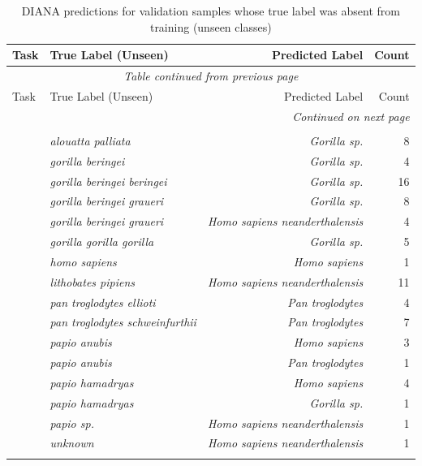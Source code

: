 \begin{longtable}{llrr}
\caption{DIANA predictions for validation samples whose true label was absent from training (unseen classes)\label{tab:unseen_labels}}\\
\toprule
Task & True Label (Unseen) & Predicted Label & Count \\
\midrule
\endfirsthead
\multicolumn{4}{c}{\textit{Table \thetable{} continued from previous page}} \\
\toprule
Task & True Label (Unseen) & Predicted Label & Count \\
\midrule
\endhead
\midrule
\multicolumn{4}{r}{\textit{Continued on next page}} \\
\endfoot
\bottomrule
\endlastfoot
\multicolumn{4}{l}{\textbf{Sample Host}} \\
\addlinespace[0.5em]
 & \textit{alouatta palliata} & \textit{Gorilla sp.} & 8 \\
 & \textit{gorilla beringei} & \textit{Gorilla sp.} & 4 \\
 & \textit{gorilla beringei beringei} & \textit{Gorilla sp.} & 16 \\
 & \textit{gorilla beringei graueri} & \textit{Gorilla sp.} & 8 \\
 & \textit{gorilla beringei graueri} & \textit{Homo sapiens neanderthalensis} & 4 \\
 & \textit{gorilla gorilla gorilla} & \textit{Gorilla sp.} & 5 \\
 & \textit{homo sapiens} & \textit{Homo sapiens} & 1 \\
 & \textit{lithobates pipiens} & \textit{Homo sapiens neanderthalensis} & 11 \\
 & \textit{pan troglodytes ellioti} & \textit{Pan troglodytes} & 4 \\
 & \textit{pan troglodytes schweinfurthii} & \textit{Pan troglodytes} & 7 \\
 & \textit{papio anubis} & \textit{Homo sapiens} & 3 \\
 & \textit{papio anubis} & \textit{Pan troglodytes} & 1 \\
 & \textit{papio hamadryas} & \textit{Homo sapiens} & 4 \\
 & \textit{papio hamadryas} & \textit{Gorilla sp.} & 1 \\
 & \textit{papio sp.} & \textit{Homo sapiens neanderthalensis} & 1 \\
 & \textit{unknown} & \textit{Homo sapiens neanderthalensis} & 1 \\
\addlinespace
\multicolumn{4}{l}{\textbf{Material}} \\

\end{longtable}
